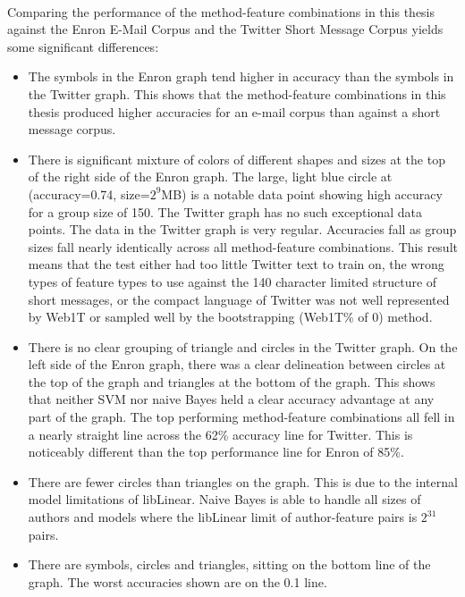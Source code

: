 \paragraph*{} Comparing the performance of the method-feature combinations in this thesis against the Enron E-Mail Corpus and the Twitter Short Message Corpus yields some significant differences:
	\begin{itemize}
		\item The symbols in the Enron graph tend higher in accuracy than the symbols in the Twitter graph.  This shows that the method-feature combinations in this thesis produced higher accuracies for an e-mail corpus than against a short message corpus.
		\item There is significant mixture of colors of different shapes and sizes at the top of the right side of the Enron graph.  The large, light blue circle  at (accuracy=0.74, size=$2^9$MB) is a notable data point showing high accuracy for a group size of 150.  The Twitter graph has no such exceptional data points.  The data in the Twitter graph is very regular.  Accuracies fall as group sizes fall nearly identically across all method-feature combinations.  This result means that the test either had too little Twitter text to train on, the wrong types of feature types to use against the 140 character limited structure of short messages, or the compact language of Twitter was not well represented by Web1T or sampled well by the bootstrapping (Web1T\% of 0) method.
		\item There is no clear grouping of triangle and circles in the Twitter graph.  On the left side of the Enron graph, there was a clear delineation between circles at the top of the graph and triangles at the bottom of the graph.  This shows that neither SVM nor naive Bayes held a clear accuracy advantage at any part of the graph.  The top performing method-feature combinations all fell in a nearly straight line across the 62\% accuracy line for Twitter.  This is noticeably different than the top performance line for Enron of 85\%.


		\item There are fewer circles than triangles on the graph.  This is due to the internal model limitations of libLinear.  Naive Bayes is able to handle all sizes of authors and models where the libLinear limit of author-feature pairs is $2^{31}$ pairs.
		\item There are symbols, circles and triangles, sitting on the bottom line of the graph.  The worst accuracies shown are on the 0.1 line. 
	\end{itemize}

